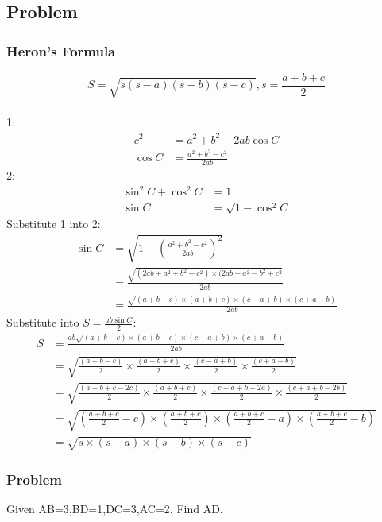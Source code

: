 \documentclass{article}
\begin{document}
\subsection{Problem}
\subsubsection{Heron's Formula}
$$S= \sqrt {s (s-a) (s-b) (s-c)}, s=\frac{a+b+c}{2}$$\\
1:
\begin{align*} 
c^2&=a^2+b^2-2ab\cos C\\
\cos C&=\frac{a^2+b^2-c^2}{2ab}
\end{align*}
2: 
\begin{align*}    
\sin ^2 C+\cos ^2 C&=1\\
\sin C&=\sqrt{1-\cos ^2 C}
\end{align*}
Substitute 1 into 2: 
\begin{align*} 
\sin C&=\sqrt{1-(\frac{a^2+b^2-c^2}{2ab})^2}\\
&=\frac{\sqrt{(2ab+a^2+b^2-c^2)\times (2ab-a^2-b^2+c^2}}{2ab}\\
&=\frac{\sqrt{(a+b-c)\times (a+b+c)\times (c-a+b)\times (c+a-b)}}{2ab}
\end{align*}
Substitute into $S=\frac{ab\sin C}{2}$:
\begin{align*}
    S&=\frac{ab\sqrt{(a+b-c)\times (a+b+c)\times (c-a+b)\times (c+a-b)}}{2ab}\\
    &=\sqrt{\frac{(a+b-c)}{2}\times \frac{(a+b+c)}{2}\times \frac{(c-a+b)}{2}\times \frac{(c+a-b)}{2}}\\
    &=\sqrt{\frac{(a+b+c-2c)}{2}\times \frac{(a+b+c)}{2}\times \frac{(c+a+b-2a)}{2}\times \frac{(c+a+b-2b)}{2}}\\
    &=\sqrt{(\frac{a+b+c}{2}-c)\times (\frac{a+b+c}{2})\times (\frac{a+b+c}{2}-a)\times (\frac{a+b+c}{2}-b)}\\
    &=\sqrt{s\times (s-a)\times(s-b)\times(s-c)}
\end{align*}
\pagebreak


\subsubsection{Problem}
Given AB=3,BD=1,DC=3,AC=2. Find AD.




\end{document}
